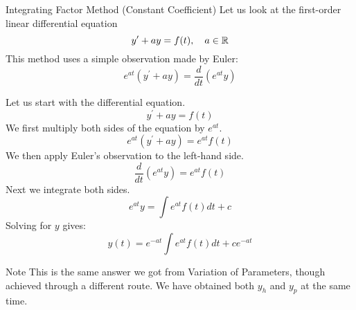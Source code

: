 \documentclass{beamer}
\begin{document}
\begin{frame}
\begin{block}{Integrating Factor Method (Constant Coefficient)}
Let us look at the first-order linear differential equation
\begin{equation*}
y^\prime+ ay = f(t),\quad a\in\mathbb{R}
\end{equation*}
This method uses a simple observation made by Euler:
\begin{equation*}
e^{at}\left(y^\prime+ay\right) = \dfrac{d}{dt}\left(e^{at} y\right)
\end{equation*}
\begin{overprint}
Let us start with the differential equation.
\begin{equation*}
y^\prime+ ay = f(t)
\end{equation*}
We first multiply both sides of the equation by $e^{at}$.
\begin{equation*}
e^{at}\left(y^\prime+ay\right) = e^{at} f(t) 
\end{equation*}
We then apply Euler's observation to the left-hand side.
\begin{equation*}
\dfrac{d}{dt}\left(e^{at} y\right) = e^{at} f(t) 
\end{equation*}
Next we integrate both sides.
\begin{equation*}
e^{at} y = \int e^{at} f(t)  dt + c
\end{equation*}
Solving for $y$ gives:
\begin{equation*}
y(t) = e^{-at} \int e^{at} f(t)  dt + c e^{-at}
\end{equation*}
\end{overprint}
\end{block}
\begin{block}{Note}
This is the same answer we got from Variation of Parameters, though achieved through a different route. We have obtained both $y_h$ and $y_p$ at the same time.
\end{block}
\end{frame}
\end{document}
